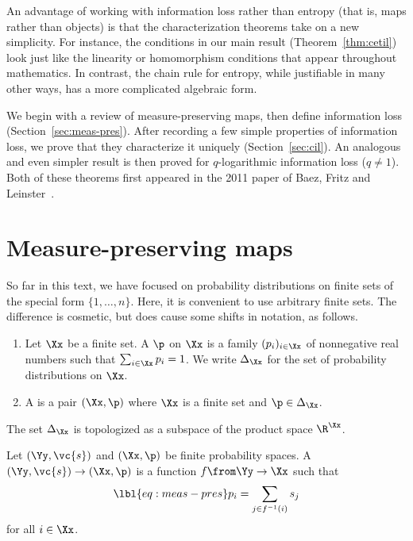 An advantage of working with information loss rather than entropy (that is,
maps rather than objects) is that the characterization theorems take on a
new simplicity.  For instance, the conditions in our main result
(Theorem~\ref{thm:cetil}) look just like the linearity or homomorphism
conditions that appear throughout mathematics.  In contrast, the
chain%
%
% 
rule for entropy, while justifiable in many other ways, has a more
complicated algebraic form.

We begin with a review of measure-preserving maps, then define information
loss (Section~\ref{sec:meas-pres}).  After recording a few simple
properties of information loss, we prove that they characterize it uniquely
(Section~\ref{sec:cil}).  An analogous and even simpler result is then
proved for $q$-logarithmic information loss ($q \neq 1$).  Both of these
theorems first appeared in the 2011 paper of Baez, Fritz and
Leinster~\cite{CETIL}.


\section{Measure-preserving maps}


So far in this text, we have focused on probability distributions on finite
sets of the special form $\{1, \ldots, n\}$.  Here, it is convenient to use
arbitrary finite sets.  The difference is cosmetic, but does cause some
shifts in notation, as follows.

\begin{defn}
\begin{enumerate}
\item 
Let $\Xx$ be a finite set.  A  $\p$ on $\Xx$ is a family $(p_i)_{i \in \Xx}$ of nonnegative
real numbers such that $\sum_{i \in \Xx} p_i = 1$.  We write
$\Delta_\Xx$ for the set of probability distributions on $\Xx$.

\item
A  is a pair $(\Xx, \p)$ where $\Xx$ is a finite set and $\p \in
\Delta_\Xx$.
\end{enumerate}
\end{defn}

The set $\Delta_\Xx$ is topologized as a subspace of the product space
$\R^\Xx$. 

\begin{defn}
Let $(\Yy, \vc{s})$ and $(\Xx, \p)$ be finite probability spaces.  A
 $(\Yy, \vc{s}) \to (\Xx, \p)$ is a function $f \from \Yy \to \Xx$ such
that
% 
\begin{equation}
\lbl{eq:meas-pres}
p_i = \sum_{j \in f^{-1}(i)} s_j
\end{equation}
% 
for all $i \in \Xx$.  
\end{defn}

